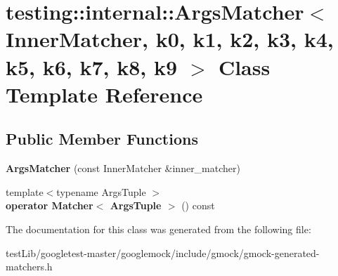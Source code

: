 \hypertarget{classtesting_1_1internal_1_1ArgsMatcher}{}\section{testing\+:\+:internal\+:\+:Args\+Matcher$<$ Inner\+Matcher, k0, k1, k2, k3, k4, k5, k6, k7, k8, k9 $>$ Class Template Reference}
\label{classtesting_1_1internal_1_1ArgsMatcher}
\subsection*{Public Member Functions}
\begin{DoxyCompactItemize}
\item 
\mbox{\label{classtesting_1_1internal_1_1ArgsMatcher_a2879d7455f2da2a5a2f2b6759dbc0561}} 
{\bfseries Args\+Matcher} (const Inner\+Matcher \&inner\+\_\+matcher)
\item 
\mbox{\label{classtesting_1_1internal_1_1ArgsMatcher_ad55698b0de384a9d8875cef5b172cb4a}} 
{\footnotesize template$<$typename Args\+Tuple $>$ }\\{\bfseries operator Matcher$<$ Args\+Tuple $>$} () const
\end{DoxyCompactItemize}


The documentation for this class was generated from the following file\+:\begin{DoxyCompactItemize}
\item 
test\+Lib/googletest-\/master/googlemock/include/gmock/gmock-\/generated-\/matchers.\+h\end{DoxyCompactItemize}
